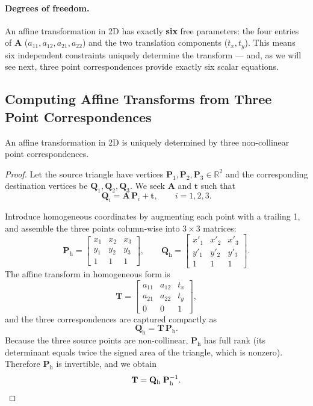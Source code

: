 \paragraph{Degrees of freedom.}
An affine transformation in 2D has exactly \textbf{six} free parameters: the four entries of $\mathbf{A}$ ($a_{11}, a_{12}, a_{21}, a_{22}$) and the two translation components ($t_x, t_y$).  This means six independent constraints uniquely determine the transform --- and, as we will see next, three point correspondences provide exactly six scalar equations.

\subsection{Computing Affine Transforms from Three Point Correspondences}

\begin{theorem}
An affine transformation in 2D is uniquely determined by three non-collinear point correspondences.
\end{theorem}

\begin{proof}
Let the source triangle have vertices $\mathbf{P}_1, \mathbf{P}_2, \mathbf{P}_3 \in \mathbb{R}^2$ and the corresponding destination vertices be $\mathbf{Q}_1, \mathbf{Q}_2, \mathbf{Q}_3$.  We seek $\mathbf{A}$ and $\mathbf{t}$ such that
\[
    \mathbf{Q}_i = \mathbf{A}\,\mathbf{P}_i + \mathbf{t}, \qquad i = 1,2,3.
\]

Introduce homogeneous coordinates by augmenting each point with a trailing 1, and assemble the three points column-wise into $3\times3$ matrices:
\[
    \mathbf{P}_{\mathrm{h}} =
    \begin{bmatrix}
        x_1 & x_2 & x_3 \\
        y_1 & y_2 & y_3 \\
        1   & 1   & 1
    \end{bmatrix},
    \qquad
    \mathbf{Q}_{\mathrm{h}} =
    \begin{bmatrix}
        x'_1 & x'_2 & x'_3 \\
        y'_1 & y'_2 & y'_3 \\
        1    & 1    & 1
    \end{bmatrix}.
\]
The affine transform in homogeneous form is
\[
    \mathbf{T} =
    \begin{bmatrix}
        a_{11} & a_{12} & t_x \\
        a_{21} & a_{22} & t_y \\
        0      & 0      & 1
    \end{bmatrix},
\]
and the three correspondences are captured compactly as
\[
    \mathbf{Q}_{\mathrm{h}} = \mathbf{T}\,\mathbf{P}_{\mathrm{h}}.
\]
Because the three source points are non-collinear, $\mathbf{P}_{\mathrm{h}}$ has full rank (its determinant equals twice the signed area of the triangle, which is nonzero).  Therefore $\mathbf{P}_{\mathrm{h}}$ is invertible, and we obtain
\[
    \mathbf{T} = \mathbf{Q}_{\mathrm{h}}\; \mathbf{P}_{\mathrm{h}}^{-1}. \qedhere
\]
\end{proof}

